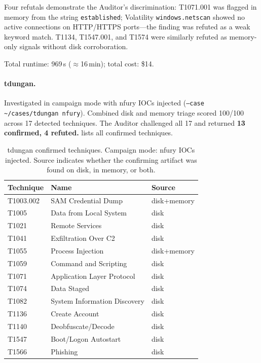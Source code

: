 \documentclass[sigconf, nonacm]{acmart}
\begin{document}
Four refutals demonstrate the Auditor's discrimination:
T1071.001 was flagged in memory from the string \texttt{established};
Volatility \texttt{windows.netscan} showed no active connections on
HTTP/HTTPS ports---the finding was refuted as a weak keyword match.
T1134, T1547.001, and T1574 were similarly refuted as memory-only
signals without disk corroboration.

Total runtime: 969\,s ($\approx$16\,min); total cost: \$14.

\paragraph{tdungan.}
Investigated in campaign mode with nfury IOCs injected
(\texttt{--case \textasciitilde/cases/tdungan nfury}).
Combined disk and memory triage scored 100/100 across 17 detected
techniques. The Auditor challenged all 17 and returned
\textbf{13 confirmed, 4 refuted.}  lists all confirmed
techniques.

\begin{table}[ht]
\centering\small
\caption{tdungan confirmed techniques. Campaign mode: nfury IOCs injected.
  Source indicates whether the confirming artifact was found on disk,
  in memory, or both.}
\label{tab:tdungan}
\begin{tabular}{@{}lll@{}}
\toprule
Technique & Name & Source \\
\midrule
T1003.002 & SAM Credential Dump         & disk+memory \\
T1005     & Data from Local System      & disk \\
T1021     & Remote Services             & disk \\
T1041     & Exfiltration Over C2        & disk \\
T1055     & Process Injection           & disk+memory \\
T1059     & Command and Scripting       & disk \\
T1071     & Application Layer Protocol  & disk \\
T1074     & Data Staged                 & disk \\
T1082     & System Information Discovery& disk \\
T1136     & Create Account              & disk \\
T1140     & Deobfuscate/Decode          & disk \\
T1547     & Boot/Logon Autostart        & disk \\
T1566     & Phishing                    & disk \\
\bottomrule
\end{tabular}
\end{table}
\end{document}

